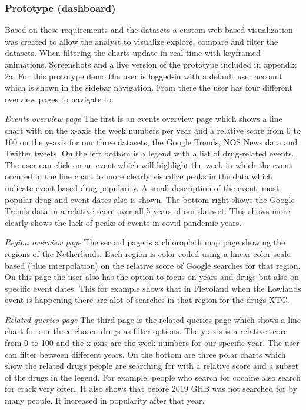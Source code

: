 \subsubsection {Prototype (dashboard)}\hfill

Based on these requirements and the datasets a custom web-based visualization was created to allow the analyst to visualize explore, compare and filter the datasets. When filtering the charts update in real-time with keyframed animations. Screenshots and a live version of the prototype included in appendix 2a. For this prototype demo the user is logged-in with a default user account which is shown in the sidebar navigation. From there the user has four different overview pages to navigate to. \newline


\textit{Events overview page}\newline
The first is an events overview page which shows a line chart with on the x-axis the week numbers per year and a relative score from 0 to 100 on the y-axis for our three datasets, the Google Trends, NOS News data and Twitter tweets. On the left bottom is a legend with a list of drug-related events. The user can click on an event which will highlight the week in which the event occured in the line chart to more clearly visualize peaks in the data which indicate event-based drug popularity. A small description of the event, most popular drug and event dates also is shown. The bottom-right shows the Google Trends data in a relative score over all 5 years of our dataset. This shows more clearly shows the lack of peaks of events in covid pandemic years.

\textit{Region overview page}\newline
The second page is a chloropleth map page showing the regions of the Netherlands. Each region is color coded using a linear color scale based (blue interpolation) on the relative score of Google searches for that region. On this page the user also has the option to focus on years and drugs but also on specific event dates. This for example shows that in Flevoland when the Lowlands event is happening there are alot of searches in that region for the drugs XTC.

\textit{Related queries page}\newline
The third page is the related queries page which shows a line chart for our three chosen drugs as filter options. The y-axis is a relative score from 0 to 100 and the x-axis are the week numbers for our specific year. The user can filter between different years. On the bottom are three polar charts which show the related drugs people are searching for with a relative score and a subset of the drugs in the legend. For example, people who search for cocaine also search for crack very often. It also shows that before 2019 GHB was not searched for by many people. It increased in popularity after that year.

